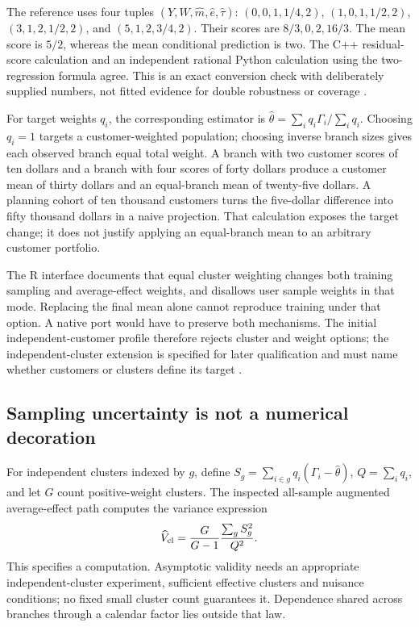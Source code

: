 The reference uses four tuples
\((Y,W,\widehat m,\widehat e,\widehat\tau)\): \((0,0,1,1/4,2)\),
\((1,0,1,1/2,2)\), \((3,1,2,1/2,2)\), and \((5,1,2,3/4,2)\). Their
scores are \(8/3,0,2,16/3\). The mean score is \(5/2\), whereas the mean
conditional prediction is two. The C++ residual-score calculation and an
independent rational Python calculation using the two-regression formula
agree. This is an exact conversion check with deliberately supplied
numbers, not fitted evidence for double robustness or coverage
\cite{exec13_grf_oracle}.

For target weights \(q_i\), the corresponding estimator is
\(\widehat\theta=\sum_iq_i\Gamma_i/\sum_iq_i\). Choosing \(q_i=1\)
targets a customer-weighted population; choosing inverse branch sizes
gives each observed branch equal total weight. A branch with two
customer scores of ten dollars and a branch with four scores of forty
dollars produce a customer mean of thirty dollars and an equal-branch
mean of twenty-five dollars. A planning cohort of ten thousand customers
turns the five-dollar difference into fifty thousand dollars in a naive
projection. That calculation exposes the target change; it does not
justify applying an equal-branch mean to an arbitrary customer
portfolio.

The R interface documents that equal cluster weighting changes both
training sampling and average-effect weights, and disallows user sample
weights in that mode. Replacing the final mean alone cannot reproduce
training under that option. A native port would have to preserve both
mechanisms. The initial independent-customer profile therefore rejects
cluster and weight options; the independent-cluster extension is
specified for later qualification and must name whether customers or
clusters define its target \cite{exec13_grf_rpath}.

\subsection{Sampling uncertainty is not a numerical decoration}

For independent clusters indexed by \(g\), define
\(S_g=\sum_{i\in g}q_i(\Gamma_i-\widehat\theta)\), \(Q=\sum_iq_i\), and
let \(G\) count positive-weight clusters. The inspected all-sample
augmented average-effect path computes the variance expression \[
 \widehat V_{\rm cl}=\frac{G}{G-1}\frac{\sum_g S_g^2}{Q^2}.
\] This specifies a computation. Asymptotic validity needs an
appropriate independent-cluster experiment, sufficient effective
clusters and nuisance conditions; no fixed small cluster count
guarantees it. Dependence shared across branches through a calendar
factor lies outside that law.

